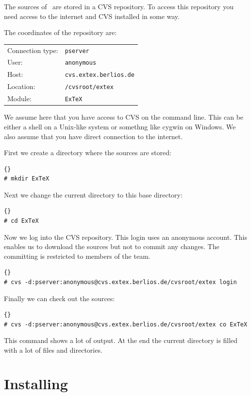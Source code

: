 \documentclass{extex-doc}
\begin{document}
The sources of \ExTeX\ are stored in a CVS repository. To access this
repository you need access to the internet and CVS installed in some
way.

The coordinates of the repository are:
\medskip

\begin{tabular}{ll}\toprule
  Connection type: & \texttt{pserver}			\\
  User:		   & \texttt{anonymous}			\\
  Host:		   & \texttt{cvs.extex.berlios.de}	\\
  Location:	   & \texttt{/cvsroot/extex}		\\
  Module:	   & \texttt{ExTeX}			\\\bottomrule
\end{tabular}
\bigskip

We assume here that you have access to CVS on the command line. This
can be either a shell on a Unix-like system or somethng like cygwin on
Windows. We also assume that you have direct connection to the internet.

First we create a directory where the sources are stored:
\begin{lstlisting}{}
# mkdir ExTeX
\end{lstlisting}

Next we change the current directory to this base directory:
\begin{lstlisting}{}
# cd ExTeX
\end{lstlisting}

Now we log into the CVS repository. This login uses an anonymous
account. This enables us to download the sources but not to commit any
changes. The committing is restricted to members of the \ExTeX{} team.
\begin{lstlisting}{}
# cvs -d:pserver:anonymous@cvs.extex.berlios.de/cvsroot/extex login
\end{lstlisting}

Finally we can check out the sources:
\begin{lstlisting}{}
# cvs -d:pserver:anonymous@cvs.extex.berlios.de/cvsroot/extex co ExTeX
\end{lstlisting}

This command shows a lot of output. At the end the current directory
is filled with a lot of files and directories.

\section{Installing \ExTeX}
\end{document}
